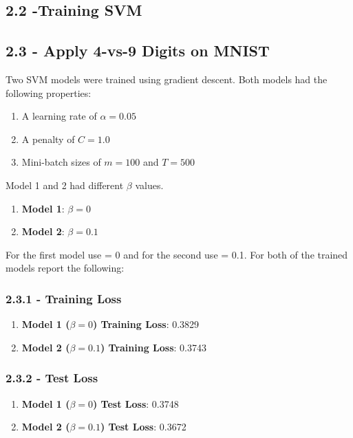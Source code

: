 \documentclass[10pt]{article}
\begin{document}
\subsection{2.2 -Training SVM}
\subsection{2.3 - Apply 4-vs-9 Digits on MNIST}

Two SVM models were trained using gradient descent. Both models had the following properties: 

\begin{enumerate}
\item A learning rate of $\alpha = 0.05 $
\item A penalty of $C = 1.0$
\item Mini-batch sizes of $m = 100$ and $T = 500$
\end{enumerate}

Model 1 and 2 had different $\beta$ values.

\begin{enumerate}
\item \textbf{Model 1}: $\beta = 0 $ 
\item \textbf{Model 2}: $\beta = 0.1 $
\end{enumerate}


 For the first model use   = 0 and for the second use   = 0.1. For both of the trained models report the following:

\subsubsection{2.3.1 - Training Loss}

\begin{enumerate}
\item \textbf{Model 1 ($\beta = 0 $) Training Loss}: 0.3829
\item \textbf{Model 2 ($\beta = 0.1 $) Training Loss}: 0.3743
\end{enumerate}

\subsubsection{2.3.2 - Test Loss}

\begin{enumerate}
\item \textbf{Model 1 ($\beta = 0 $) Test Loss}: 0.3748
\item \textbf{Model 2 ($\beta = 0.1 $) Test Loss}: 0.3672
\end{enumerate}
\end{document}
